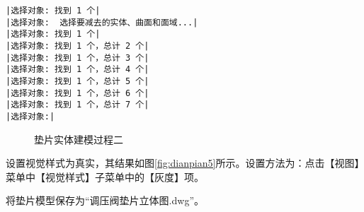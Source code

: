 \begin{procedure}
\begin{lstlisting}
|选择对象: 找到 1 个|
|选择对象:  选择要减去的实体、曲面和面域...|
|选择对象: 找到 1 个|
|选择对象: 找到 1 个，总计 2 个|
|选择对象: 找到 1 个，总计 3 个|
|选择对象: 找到 1 个，总计 4 个|
|选择对象: 找到 1 个，总计 5 个|
|选择对象: 找到 1 个，总计 6 个|
|选择对象: 找到 1 个，总计 7 个|
|选择对象:|
\end{lstlisting}
\begin{figure}[htbp]
\centering
{}\hspace{30pt}
\caption{垫片实体建模过程二}
\end{figure}
\item 设置视觉样式为真实，其结果如图\ref{fig:dianpian5}所示。设置方法为：点击【视图】菜单中【视觉样式】子菜单中的【灰度】项。
\item 将垫片模型保存为“调压阀垫片立体图.dwg”。
\end{procedure}

\endinput